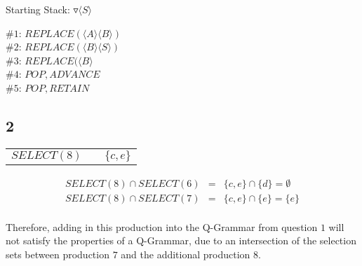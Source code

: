 \documentclass[a4paper,12pt]{article}
\newcommand{\nonterminal}[1]{\langle #1 \rangle}
\begin{document}
Starting Stack: $\triangledown \nonterminal{S}$

$\#1$: $REPLACE(\nonterminal{A}\nonterminal{B})$ \\
$\#2$: $REPLACE(\nonterminal{B}\nonterminal{S})$ \\
$\#3$: $REPLACE(\nonterminal{B}$ \\
$\#4$: $POP,ADVANCE$ \\
$\#5$: $POP,RETAIN$ \\

\subsection*{2}

\begin{tabular}{lcl}
$SELECT(8)$	&	\hspace{10mm}	&	$\{c,e\}$	\\
\end{tabular}

\begin{eqnarray*}
SELECT(8) \cap SELECT(6)	&	=	&	\{c,e\} \cap \{d\} = \emptyset \\
SELECT(8) \cap SELECT(7)	&	=	&	\{c,e\} \cap \{e\} = \{e\} \\
\end{eqnarray*}

Therefore, adding in this production into the Q-Grammar from question $1$
will not satisfy the properties of a Q-Grammar, due to an intersection
of the selection sets between production $7$ and the additional
production $8$.
\end{document}
